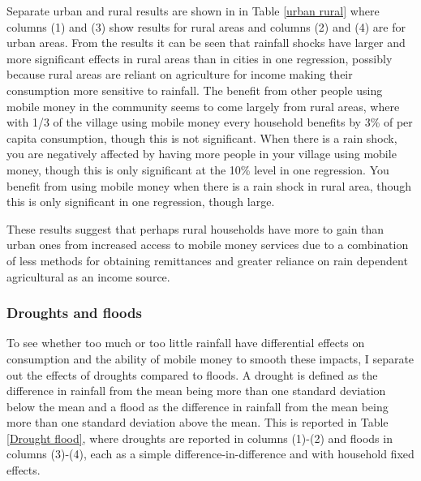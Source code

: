 Separate urban and rural results are shown in in Table \ref{urban rural} where columns (1) and (3) show results for rural areas and columns (2) and (4) are for urban areas. From the results it can be seen that rainfall shocks have larger and more significant effects in rural areas than in cities in one regression, possibly because rural areas are reliant on agriculture for income making their consumption more sensitive to rainfall. The benefit from other people using mobile money in the community seems to come largely from rural areas, where with 1/3 of the village using mobile money every household benefits by 3\% of per capita consumption, though this is not significant. When there is a rain shock, you are negatively affected by having more people in your village using mobile money, though this is only significant at the 10\% level in one regression. You benefit from using mobile money when there is a rain shock in rural area, though this is only significant in one regression, though large.   



These results suggest that perhaps rural households have more to gain than urban ones from increased access to mobile money services due to a combination of less methods for obtaining remittances and greater reliance on rain dependent agricultural as an income source. 

\subsubsection{Droughts and floods}
To see whether too much or too little rainfall have differential effects on consumption and the ability of mobile money to smooth these impacts, I separate out the effects of droughts compared to floods. A drought is defined as the difference in rainfall from the mean being more than one standard deviation below the mean and a flood as the difference in rainfall from the mean being more than one standard deviation above the mean. This is reported in Table \ref{Drought flood}, where droughts are reported in columns (1)-(2) and floods in columns (3)-(4), each as a simple difference-in-difference and with household fixed effects. 

